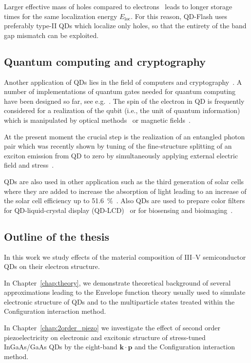 \documentclass[
a4paper, %
11pt, %
onecolumn, %
openany, %
oldfontcommands,
]{memoir}
\begin{document}
Larger effective mass of holes compared to electrons~\cite{sze} leads to longer storage times for the same localization energy $E_\mathrm{loc}$. For this reason, QD-Flash uses preferably type-II QDs which localize only holes, so that the entirety of the band gap mismatch can be exploited.

\subsection*{Quantum computing and cryptography}
Another application of QDs lies in the field of computers and cryptography~\cite{Feynman,Deutsch,Loss}. A number of implementations of quantum gates needed for quantum computing have been designed so far, see e.g.~\cite{Bennett}. The spin of the electron in QD is frequently considered for a realization of the qubit (i.e., the unit of quantum information)~\cite{Loss} which is manipulated by optical methods~\cite{Hafenbrak} or magnetic fields~\cite{Burkard}. 

At the present moment the crucial step is the realization of an entangled photon pair which was recently shown by tuning of the fine-structure splitting of an exciton emission from QD to zero by simultaneously applying external electric field and stress~\cite{Trotta}.

\vspace{0.2cm}
QDs are also used in other application such as the third generation of solar cells where they are added to increase the absorption of light leading to an increase of the solar cell efficiency up to 51.6~$\%$~\cite{Jiang_NonoEn2015_QDsolarcell}. Also QDs are used to prepare color filters for QD-liquid-crystal display (QD-LCD)~\cite{Chen_IEEE_2017_QLED} or for biosensing and bioimaging~\cite{Li_JMaterChemB_2014_biosensing}.

\subsection*{Outline of the thesis}
\vspace{0.2cm}
In this work we study effects of the material composition of III--V semiconductor QDs on their electron structure.

In Chapter~\ref{chap:theory}, we demonstrate theoretical background of several approximations leading to the Envelope function theory usually used to simulate electronic structure of QDs and to the multiparticle states treated within the Configuration interaction method.

In Chapter~\ref{chap:2order_piezo} we investigate the effect of second order piezoelectricity on electronic and excitonic structure of stress-tuned InGaAs/GaAs QDs by the eight-band $\mathbf{k \cdot p}$ and the Configuration interaction method.
\end{document}
